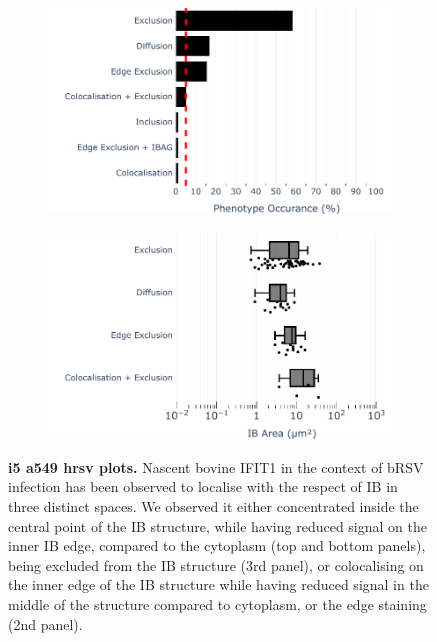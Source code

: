 \begin{figure}
    \begin{subfigure}{0.495\textwidth}
        \caption{}
        \includegraphics[width=1\linewidth]{09. Chapter 4/Figs/02. Infection/03. IFIT5/01. bar_i5_a549.pdf} 
    \end{subfigure}
    \begin{subfigure}{0.495\textwidth}
        \caption{}
        \includegraphics[width=1\linewidth]{09. Chapter 4/Figs/02. Infection/03. IFIT5/02. box_i5_a549.pdf}
    \end{subfigure}
    \caption[i5 a549 hrsv plots]{\textbf{i5 a549 hrsv plots.} Nascent bovine IFIT1 in the context of bRSV infection has been observed to localise with the respect of IB in three distinct spaces. We observed it either concentrated inside the central point of the IB structure, while having reduced signal on the inner IB edge, compared to the cytoplasm (top and bottom panels), being excluded from the IB structure (3rd panel), or colocalising on the inner edge of the IB structure while having reduced signal in the middle of the structure compared to cytoplasm, or the edge staining (2nd panel).}
    \label{fig:i5 a549 hrsv plots}
\end{figure}

